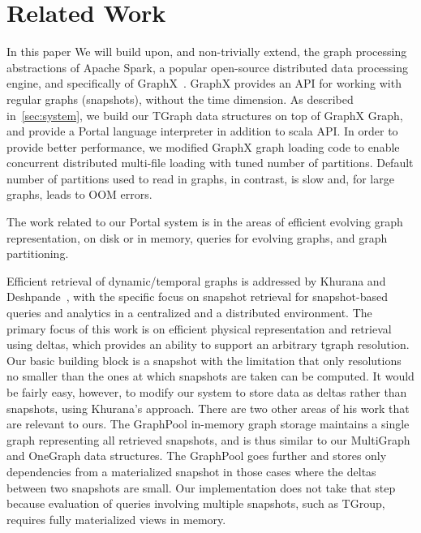 \section{Related Work}
\label{sec:related}

In this paper We will build upon, and non-trivially extend, the graph
processing abstractions of Apache Spark, a popular open-source
distributed data processing engine, and specifically of
GraphX~\cite{DBLP:conf/osdi/GonzalezXDCFS14}.  GraphX provides an API
for working with regular graphs (snapshots), without the time
dimension.  As described in~\ref{sec:system}, we build our TGraph data
structures on top of GraphX Graph, and provide a Portal language
interpreter in addition to scala API.  In order to provide better
performance, we modified GraphX graph loading code to enable
concurrent distributed multi-file loading with tuned number of
partitions.  Default number of partitions used to read in graphs, in
contrast, is slow and, for large graphs, leads to OOM errors. 

The work related to our Portal system is in the areas of efficient
evolving graph representation, on disk or in memory, queries for
evolving graphs, and graph partitioning.

Efficient retrieval of dynamic/temporal graphs is addressed by Khurana
and Deshpande~\cite{Khurana2003}, with the specific focus on snapshot
retrieval for snapshot-based queries and analytics in a centralized
and a distributed environment.  The primary focus of this work is on
efficient physical representation and retrieval using deltas, which
provides an ability to support an arbitrary tgraph resolution.  Our
basic building block is a snapshot with the limitation that only
resolutions no smaller than the ones at which snapshots are taken can
be computed.  It would be fairly easy, however, to modify our system
to store data as deltas rather than snapshots, using Khurana's
approach.  There are two other areas of his work that are relevant to
ours.  The GraphPool in-memory graph storage maintains a single graph
representing all retrieved snapshots, and is thus similar to our
MultiGraph and OneGraph data structures.  The GraphPool goes further
and stores only dependencies from a materialized snapshot in those
cases where the deltas between two snapshots are small.  Our
implementation does not take that step because evaluation of queries
involving multiple snapshots, such as TGroup, requires fully
materialized views in memory.

